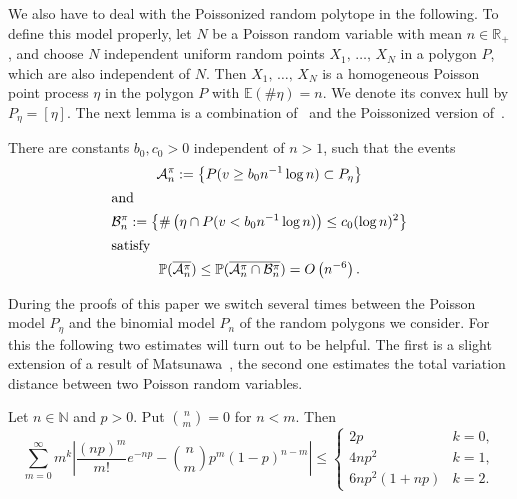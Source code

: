 \documentclass[AHL,Unicode,longabstracts,published]{cedram}
\newcommand{\bbR}{\mathbb{R}}
\newcommand{\bbE}{\mathbb{E}}
\newcommand{\bbP}{\mathbb{P}}
\newcommand{\bbN}{\mathbb{N}}
\newcommand{\clA}{\mathcal{A}}
\newcommand{\clB}{\mathcal{B}}
\begin{document}
We also have to deal with the Poissonized random polytope in the following. To define this model properly, let $N$ be a Poisson random variable with mean $n\in \bbR_+$, and choose $N$ independent uniform random points $X_1,\,\dots,\,X_N$ in a polygon $P$, which are also independent of $N$. Then $X_1,\,\dots,\,X_N$ is a homogeneous Poisson point process $\eta$ in the polygon $P$ with $\bbE(\#\eta)=n$. We denote its convex hull by $P_\eta=[\eta]$. The next lemma is a combination of~\cite[Lemma~5.3]{BR10} and the Poissonized version of~\cite[Theorem~1]{BD}.

\begin{lemm}\label{le:floating-Peta}
There are constants $b_0, c_0>0$ independent of $n>1$, such that the events
\begin{gather*}
\clA^\pi_n := \left\{P(v\ge b_0 n^{-1} \log n)\subset P_\eta\right\}
\\
\intertext{and}
\clB^\pi_n := \left\{\#\left(\eta \cap P(v< b_0 n^{-1} \log n)\right)\leq c_0 (\log n)^2\right\}
\\
\intertext{satisfy}
\bbP(\overline{\clA^\pi_n}) \leq \bbP(\overline{\clA^\pi_n \cap \clB^\pi_n}) = O\left(n^{-6}\right).
\end{gather*}
\end{lemm}

During the proofs of this paper we switch several times between the Poisson model $P_\eta$ and the binomial model $P_n$ of the random polygons we consider. For this the following two estimates will turn out to be helpful. The first is a slight extension of a result of Matsunawa~\cite{Matsunawa}, the second one estimates the total variation distance between two Poisson random variables.

\begin{lemm}\label{le:diff-Poisson-binom}
Let $n \in \bbN$ and $p>0$. Put $\binom{n}{m}=0$ for $n<m$. Then
\begin{equation*}
\sum_{m=0}^\infty m^k \left|\frac{(np)^m}{m!} e^{-np} - \binom{n}{m} p^m (1-p)^{n-m} \right| \leq
\begin{cases}
2p & k=0, \\
4np^2 & k=1, \\
6np^2 (1+ n p) & k=2.
\end{cases}
\end{equation*}
\end{lemm}
\end{document}
